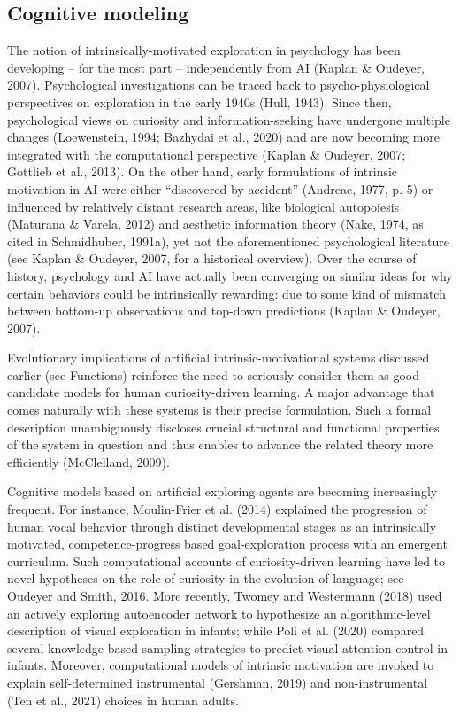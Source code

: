 \subsection{Cognitive modeling} The notion of intrinsically-motivated exploration in psychology has been developing -- for the most part -- independently from \ac{AI} (Kaplan \& Oudeyer, 2007). Psychological investigations can be traced back to psycho-physiological perspectives on exploration in the early 1940s (Hull, 1943). Since then, psychological views on curiosity and information-seeking have undergone multiple changes (Loewenstein, 1994; Bazhydai et al., 2020) and are now becoming more integrated with the computational perspective (Kaplan \& Oudeyer, 2007; Gottlieb et al., 2013). On the other hand, early formulations of intrinsic motivation in \ac{AI} were either “discovered by accident” (Andreae, 1977, p. 5) or influenced by relatively distant research areas, like biological autopoiesis (Maturana \& Varela, 2012) and aesthetic information theory (Nake, 1974, as cited in Schmidhuber, 1991a), yet not the aforementioned psychological literature (see Kaplan \& Oudeyer, 2007, for a historical overview). Over the course of history, psychology and \ac{AI} have actually been converging on similar ideas for why certain behaviors could be intrinsically rewarding: due to some kind of mismatch between bottom-up observations and top-down predictions (Kaplan \& Oudeyer, 2007).

Evolutionary implications of artificial intrinsic-motivational systems discussed earlier (see Functions) reinforce the need to seriously consider them as good candidate models for human curiosity-driven learning. A major advantage that comes naturally with these systems is their precise formulation. Such a formal description unambiguously discloses crucial structural and functional properties of the system in question and thus enables to advance the related theory more efficiently (McClelland, 2009). 

Cognitive models based on artificial exploring agents are becoming increasingly frequent. For instance, Moulin-Frier et al. (2014) explained the progression of human vocal behavior through distinct developmental stages as an intrinsically motivated, competence-progress based goal-exploration process with an emergent curriculum. Such computational accounts of curiosity-driven learning have led to novel hypotheses on the role of curiosity in the evolution of language; see Oudeyer and Smith, 2016. More recently, Twomey and Westermann (2018) used an actively exploring autoencoder network to hypothesize an algorithmic-level description of visual exploration in infants; while Poli et al. (2020) compared several knowledge-based sampling strategies to predict visual-attention control in infants. Moreover, computational models of intrinsic motivation are invoked to explain self-determined instrumental (Gershman, 2019) and non-instrumental (Ten et al., 2021) choices in human adults.


